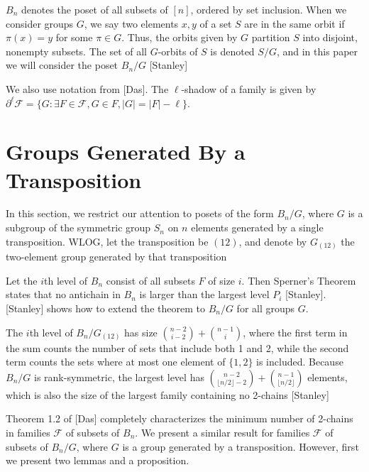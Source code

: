 \documentclass[12pt]{article}
\theoremstyle{plain}
\theoremstyle{definition}
\theoremstyle{remark}
\newcommand{\F}{\mathcal{F}}
\begin{document}

$B_n$ denotes the poset of all subsets of $[n]$, ordered by set inclusion. When we consider groups $G$, we say two elements $x, y$ of a set $S$ are in the same orbit if $\pi(x) = y$ for some $\pi \in G$. Thus, the orbits given by $G$ partition $S$ into disjoint, nonempty subsets. The set of all $G$-orbits of $S$ is denoted $S / G$, and in this paper we will consider the poset $B_n / G$ [Stanley]


We also use notation from [Das]. The $\ell$-shadow of a family is given by $\partial^{\ell}\F = \{G: \exists F \in \F, G \in F, |G| = |F| - \ell\}$.


\section{Groups Generated By a Transposition}

In this section, we restrict our attention to posets of the form $B_n / G$, where $G$ is a subgroup of the symmetric group $S_n$ on $n$ elements generated by a single transposition. WLOG, let the transposition be $(12)$, and denote by $G_{(12)}$ the two-element group generated by that transposition

Let the $i$th level of $B_n$ consist of all subsets $F$ of size $i$. Then Sperner's Theorem states that no antichain in $B_n$ is larger than the largest level $P_i$ [Stanley]. [Stanley] shows how to extend the theorem to $B_n / G$ for all groups $G$. 

The $i$th level of $B_n / G_{(12)}$ has size $\binom{n-2}{i-2} + \binom{n-1}{i}$, where the first term in the sum counts the number of sets that include both 1 and 2, while the second term counts the sets where at most one element of $\{1,2\}$ is included. Because $B_n / G$ is rank-symmetric, the largest level has $\binom{n-2}{\lfloor n/2 \rfloor -2} + \binom{n-1}{\lfloor n/2 \rfloor}$ elements, which is also the size of the largest family containing no 2-chains [Stanley]


Theorem 1.2 of [Das] completely characterizes the minimum number of 2-chains in families $\F$ of subsets of $B_n$. We present a similar result for families $\F$ of subsets of $B_n / G$, where $G$ is a group generated by a transposition. However, first we present two lemmas and a proposition.
\end{document}
